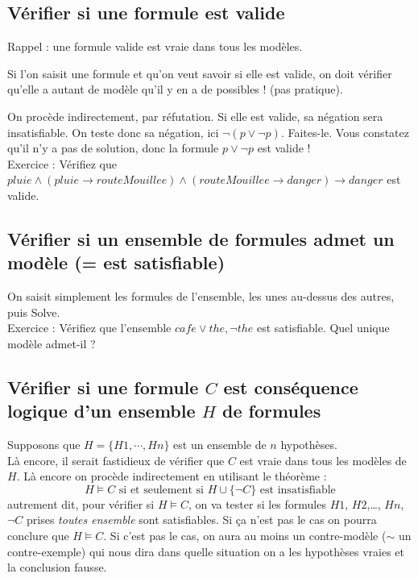 \subsection{Vérifier si une formule est valide}
Rappel : une formule valide est vraie dans tous les modèles. 

Si l'on saisit une formule et qu'on veut savoir si elle est valide, on doit vérifier qu'elle a autant de modèle qu'il y en a de possibles ! (pas pratique).

On procède indirectement, par réfutation. Si elle est valide, sa négation sera insatisfiable. On teste donc sa négation, ici $\neg(p\vee \neg p)$. Faites-le. Vous constatez qu'il n'y a pas de solution, donc la formule $p\vee \neg p$ est valide ! \\

Exercice : Vérifiez que $pluie \wedge (pluie \rightarrow routeMouillee) \wedge (routeMouillee\rightarrow danger) \rightarrow danger$ est valide. 
\subsection{Vérifier si un ensemble de formules admet un modèle (= est satisfiable)}
On saisit simplement les formules de l'ensemble, les unes au-dessus des autres, puis Solve. \\
Exercice : Vérifiez que l'ensemble $\mathit{cafe\vee the, \neg the}$ est satisfiable. Quel unique modèle admet-il ? 
\subsection{Vérifier si une formule $C$ est conséquence logique d'un ensemble $H$ de formules}
Supposons que $H=\{H1,\cdots,Hn\}$ est un ensemble de $n$ hypothèses.\\
Là encore, il serait fastidieux de vérifier que $C$ est vraie dans tous les modèles de $H$. Là encore on procède indirectement en utilisant le théorème : 
\[H\models C \mbox{ si et seulement si } H\cup\{\neg C\}\mbox{ est insatisfiable}\]
autrement dit, pour vérifier si $H\models C$, on va tester si les formules $H1$, $H2$,\ldots, $Hn$, $\neg C$ prises \emph{toutes ensemble} sont satisfiables. Si ça n'est pas le cas on pourra conclure que $H\models C$. Si c'est pas le cas, on aura au moins un contre-modèle ($\sim$ un contre-exemple) qui nous dira dans quelle situation on a les hypothèses vraies et la conclusion fausse.

